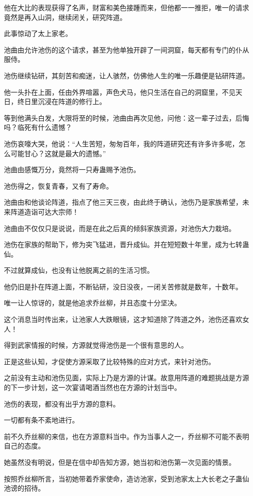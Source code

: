 \begin{this_body}
他在大比的表现获得了名声，财富和美色接踵而来，但他都一一推拒，唯一的请求竟然是再入山洞，继续闭关，研究阵道。

此事惊动了太上家老。

池曲由允许池伤的这个请求，甚至为他单独开辟了一间洞窟，每天都有专门的仆从服侍。

池伤继续钻研，其刻苦和痴迷，让人骇然，仿佛他人生的唯一乐趣便是钻研阵道。

他一头扑在上面，任由外界喧嚣，声色犬马，他只生活在自己的洞窟里，不见天日，终日里沉浸在阵道的修行上。

等到他满头白发，大限将至的时候，池曲由再次见他，问他：这一辈子过去，后悔吗？临死有什么遗憾？

池伤哀嚎大哭，他说：“人生苦短，匆匆百年，我的阵道研究还有许多许多呢，怎么可能甘心？这就是最大的遗憾。”

池曲由感慨万分，竟然将一只寿蛊赐予池伤。

池伤得之，恢复青春，又有了寿命。

池曲由和他谈论阵道，指点了他三天三夜，由此终于确认，池伤乃是家族希望，未来阵道造诣可达大宗师！

池曲由不仅仅只是说说，而是在此之后真的倾斜家族资源，对池伤大力栽培。

池伤在家族的帮助下，修为突飞猛进，晋升成仙。并在短短数十年里，成为七转蛊仙。

不过就算成仙，也没有让他脱离之前的生活习惯。

他仍旧是扑在阵道上面，不断钻研，没日没夜，一闭关苦修就是数年，十数年。

唯一让人惊讶的，就是他追求乔丝柳，并且态度十分坚决。

这个消息当时传出来，让池家人大跌眼镜，这才知道除了阵道之外，池伤还喜欢女人！

得到武家情报的时候，方源就觉得池伤是一个很有意思的人。

正是这些认知，才促使方源采取了比较特殊的应对方式，来针对池伤。

之前没有主动和池伤见面，实际上乃是方源的计谋。故意用阵道的难题挑战是方源的下一步计划，这一次宴请喝酒当然也在方源的计划当中。

池伤的表现，都没有出乎方源的意料。

一切都有条不紊地进行。

前不久乔丝柳的来信，也在方源意料当中。作为当事人之一，乔丝柳不可能不表明自己的态度。

她虽然没有明说，但是在信中却告知方源，她当初和池伤第一次见面的情景。

按照乔丝柳所言，当初她带着乔家使命，造访池家，受到池家太上大长老之子蛊仙池谤的招待。


\end{this_body}
